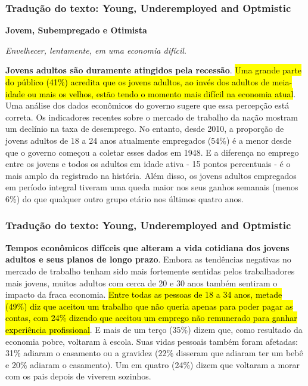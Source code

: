 \begin{frame}
\frametitle{Tradução do texto: Young, Underemployed and Optmistic}
\justifying
\textbf{Jovem, Subempregado e Otimista}\\
\vspace{0.1 cm}

\justifying
\textit{Envelhecer, lentamente, em uma economia difícil}.\\
\vspace{0.4 cm}

\justifying
\footnotesize{
\textbf{Jovens adultos são duramente atingidos pela recessão}. \hl{Uma grande parte do público (41\%) acredita que os jovens adultos, ao invés dos adultos de meia-idade ou mais os velhos, estão tendo o momento mais difícil na economia atual}. Uma análise dos dados econômicos do governo sugere que essa percepção está correta. Os indicadores recentes sobre o mercado de trabalho da nação mostram um declínio na taxa de desemprego. No entanto, desde 2010, a proporção de jovens adultos de 18 a 24 anos atualmente empregados (54\%) é a menor desde que o governo começou a coletar esses dados em 1948. E a diferença no emprego entre os jovens e todos os adultos em idade ativa - 15 pontos percentuais - é o mais amplo da registrado na história. Além disso, os jovens adultos empregados em período integral tiveram uma queda maior nos seus ganhos semanais (menos 6\%) do que qualquer outro grupo etário nos últimos quatro anos.}\\

\end{frame}

\begin{frame}
\frametitle{Tradução do texto: Young, Underemployed and Optmistic}

\justifying
\footnotesize{
\textbf{Tempos econômicos difíceis que alteram a vida cotidiana dos jovens adultos e seus planos de longo prazo}. Embora as tendências negativas no mercado de trabalho tenham sido mais fortemente sentidas pelos trabalhadores mais jovens, muitos adultos com cerca de 20 e 30 anos também sentiram o impacto da fraca economia. \hl{Entre todas as pessoas de 18 a 34 anos, metade (49\%) diz que aceitou um trabalho que não queria apenas para poder pagar as contas, com 24\% dizendo que aceitou um emprego não remunerado para ganhar experiência profissional}. E mais de um terço (35\%) dizem que, como resultado da economia pobre, voltaram à escola. Suas vidas pessoais também foram afetadas: 31\% adiaram o casamento ou a gravidez (22\% disseram que adiaram ter um bebê e 20\% adiaram o casamento). Um em quatro (24\%) dizem que voltaram a morar com os pais depois de viverem sozinhos.}

\end{frame}

